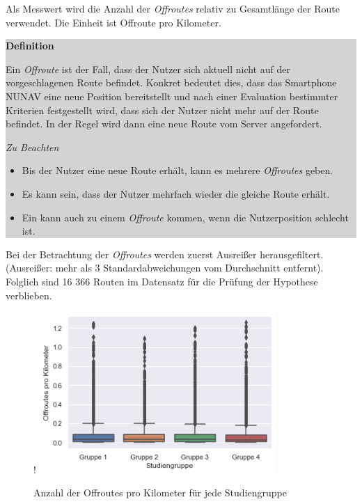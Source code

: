  Als Messwert wird die Anzahl der \textit{Offroutes} relativ zu Gesamtlänge der Route verwendet. Die Einheit ist Offroute pro Kilometer.

\smallskip

\noindent\colorbox{lightgray}{%
    \parbox{0.975\linewidth}{
        \textbf{Definition}

        Ein \textit{Offroute} ist der Fall, dass der Nutzer sich aktuell nicht auf der vorgeschlagenen Route befindet. Konkret bedeutet dies, dass das Smartphone NUNAV eine neue Position bereitstellt und nach einer Evaluation bestimmter Kriterien festgestellt wird, dass sich der Nutzer nicht mehr auf der Route befindet. In der Regel wird dann eine neue Route vom Server angefordert.
        
        \textit{Zu Beachten}
        \begin{itemize}
            \item Bis der Nutzer eine neue Route erhält, kann es mehrere \textit{Offroutes} geben.
            \item Es kann sein, dass der Nutzer mehrfach wieder die gleiche Route erhält.
            \item Ein kann auch zu einem \textit{Offroute} kommen, wenn die Nutzerposition schlecht ist.
        \end{itemize}
    }
}

\smallskip

Bei der Betrachtung der \textit{Offroutes} werden zuerst Ausreißer herausgefiltert. (Ausreißer: mehr als 3 Standardabweichungen vom Durchschnitt entfernt). Folglich sind 16 366 Routen im Datensatz für die Prüfung der Hypothese verblieben.

\begin{figure}[bth]!
    \includegraphics[width=0.8\textwidth]{contents/06_model_evaluation/res/OffRoute_Result_Overview.png}
    \caption{Anzahl der Offroutes pro Kilometer für jede Studiengruppe}
\end{figure}

